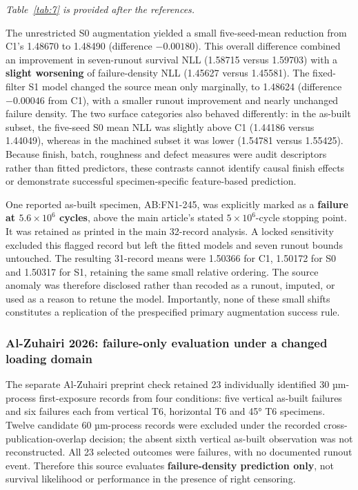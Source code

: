 \documentclass[12pt,a4paper]{article}
\begin{document}
\noindent\textit{Table~\ref{tab:7} is provided after the references.}\par

The unrestricted S0 augmentation yielded a small five-seed-mean reduction from C1's 1.48670 to 1.48490 (difference \(-0.00180\)). This overall difference combined an improvement in seven-runout survival NLL (1.58715 versus 1.59703) with a \textbf{slight worsening} of failure-density NLL (1.45627 versus 1.45581). The fixed-filter S1 model changed the source mean only marginally, to 1.48624 (difference \(-0.00046\) from C1), with a smaller runout improvement and nearly unchanged failure density. The two surface categories also behaved differently: in the as-built subset, the five-seed S0 mean NLL was slightly above C1 (1.44186 versus 1.44049), whereas in the machined subset it was lower (1.54781 versus 1.55425). Because finish, batch, roughness and defect measures were audit descriptors rather than fitted predictors, these contrasts cannot identify causal finish effects or demonstrate successful specimen-specific feature-based prediction.

One reported as-built specimen, AB:FN1-245, was explicitly marked as a \textbf{failure at \(5.6\times10^6\) cycles}, above the main article's stated \(5\times10^6\)-cycle stopping point. It was retained as printed in the main 32-record analysis. A locked sensitivity excluded this flagged record but left the fitted models and seven runout bounds untouched. The resulting 31-record means were 1.50366 for C1, 1.50172 for S0 and 1.50317 for S1, retaining the same small relative ordering. The source anomaly was therefore disclosed rather than recoded as a runout, imputed, or used as a reason to retune the model. Importantly, none of these small shifts constitutes a replication of the prespecified primary augmentation success rule.

\subsubsection{Al-Zuhairi 2026: failure-only evaluation under a changed loading domain}

The separate Al-Zuhairi preprint check retained 23 individually identified 30 µm-process first-exposure records from four conditions: five vertical as-built failures and six failures each from vertical T6, horizontal T6 and 45° T6 specimens. Twelve candidate 60 µm-process records were excluded under the recorded cross-publication-overlap decision; the absent sixth vertical as-built observation was not reconstructed. All 23 selected outcomes were failures, with no documented runout event. Therefore this source evaluates \textbf{failure-density prediction only}, not survival likelihood or performance in the presence of right censoring.
\end{document}
